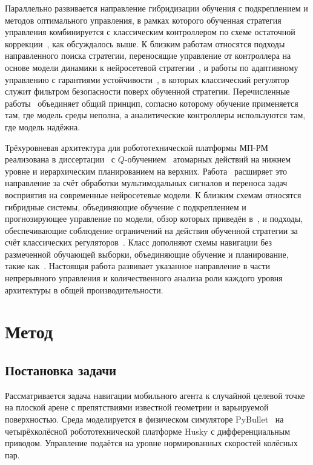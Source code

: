 \documentclass[11pt]{article}
\begin{document}
Параллельно развивается направление гибридизации обучения с подкреплением и методов оптимального управления, в рамках которого обученная стратегия управления комбинируется с классическим контроллером по схеме остаточной коррекции~\cite{silver2018residual,johannink2019residual}, как обсуждалось выше. К близким работам относятся подходы направленного поиска стратегии, переносящие управление от контроллера на основе модели динамики к нейросетевой стратегии~\cite{levine2016end}, и работы по адаптивному управлению с гарантиями устойчивости~\cite{cheng2019control}, в которых классический регулятор служит фильтром безопасности поверх обученной стратегии. Перечисленные работы~\cite{silver2018residual,johannink2019residual,levine2016end,cheng2019control} объединяет общий принцип, согласно которому обучение применяется там, где модель среды неполна, а аналитические контроллеры используются там, где модель надёжна.

Трёхуровневая архитектура для робототехнической платформы МП-РМ реализована в диссертации~\cite{kiselev2020dissertation} с $Q$-обучением~\cite{kiselev2020} атомарных действий на нижнем уровне и иерархическим планированием на верхних. Работа~\cite{veitsenfeld2024} расширяет это направление за счёт обработки мультимодальных сигналов и переноса задач восприятия на современные нейросетевые модели. К близким схемам относятся гибридные системы, объединяющие обучение с подкреплением и прогнозирующее управление по модели, обзор которых приведён в~\cite{hewing2020lbmpc}, и подходы, обеспечивающие соблюдение ограничений на действия обученной стратегии за счёт классических регуляторов~\cite{brunke2022safe}. Класс дополняют схемы навигации без размеченной обучающей выборки, объединяющие обучение и планирование, такие как~\cite{kahn2018selfsup}. Настоящая работа развивает указанное направление в части непрерывного управления и количественного анализа роли каждого уровня архитектуры в общей производительности.


\section{Метод}
\label{sec:method}

\subsection{Постановка задачи}
\label{sec:problem}

Рассматривается задача навигации мобильного агента к случайной целевой точке на плоской арене с препятствиями известной геометрии и варьируемой поверхностью. Среда моделируется в физическом симуляторе PyBullet~\cite{coumans2021pybullet} на четырёхколёсной робототехнической платформе Husky с дифференциальным приводом. Управление подаётся на уровне нормированных скоростей колёсных пар.
\end{document}
